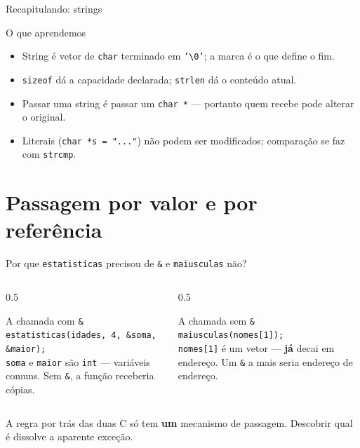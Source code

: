 \documentclass[aspectratio=169]{beamer}
\begin{document}
\begin{frame}{Recapitulando: strings}
  \begin{block}{O que aprendemos}
    \begin{itemize}
      \item String é vetor de \texttt{char} terminado em
            \texttt{'\textbackslash 0'}; a marca é o que define o fim.
      \item \texttt{sizeof} dá a capacidade declarada; \texttt{strlen} dá o
            conteúdo atual.
      \item Passar uma string é passar um \texttt{char *} --- portanto quem
            recebe pode alterar o original.
      \item Literais (\texttt{char *s = "..."}) não podem ser modificados;
            comparação se faz com \texttt{strcmp}.
    \end{itemize}
  \end{block}
\end{frame}

\section{Passagem por valor e por referência}

\begin{frame}{Por que \texttt{estatisticas} precisou de \texttt{\&} e \texttt{maiusculas} não?}
  \begin{columns}[T]
    \begin{column}{0.5\textwidth}
      \begin{exampleblock}{A chamada com \texttt{\&}}
        \texttt{estatisticas(idades, 4, \&soma, \&maior);}\\[0.3em]
        \small \texttt{soma} e \texttt{maior} são \texttt{int} --- variáveis
        comuns. Sem \texttt{\&}, a função receberia cópias.
      \end{exampleblock}
    \end{column}
    \begin{column}{0.5\textwidth}
      \begin{exampleblock}{A chamada sem \texttt{\&}}
        \texttt{maiusculas(nomes[1]);}\\[0.3em]
        \small \texttt{nomes[1]} é um vetor --- \textbf{já} decai em endereço.
        Um \texttt{\&} a mais seria endereço de endereço.
      \end{exampleblock}
    \end{column}
  \end{columns}
  \begin{alertblock}{A regra por trás das duas}
    C só tem \textbf{um} mecanismo de passagem. Descobrir qual é dissolve a
    aparente exceção.
  \end{alertblock}
\end{frame}
\end{document}
